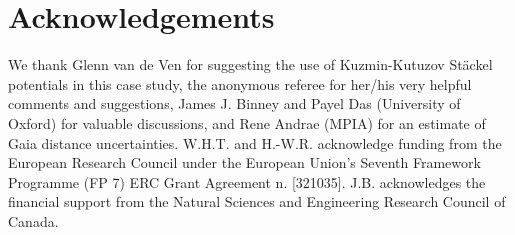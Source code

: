 \documentclass[iop,revtex4,numberedappendix,appendixfloats]{emulateapj}
\begin{document}
\section{Acknowledgements}

We thank Glenn van de Ven for suggesting the use of Kuzmin-Kutuzov St\"{a}ckel potentials in this case study, the anonymous referee for her/his very helpful comments and suggestions, James J. Binney and Payel Das (University of Oxford) for valuable discussions, and Rene Andrae (MPIA) for an estimate of Gaia distance uncertainties. W.H.T. and H.-W.R. acknowledge funding from the European Research Council under the European Union's Seventh Framework Programme (FP 7) ERC Grant Agreement n. [321035]. J.B. acknowledges the financial support from the Natural Sciences and Engineering Research Council of Canada. 

{}

\end{document}
